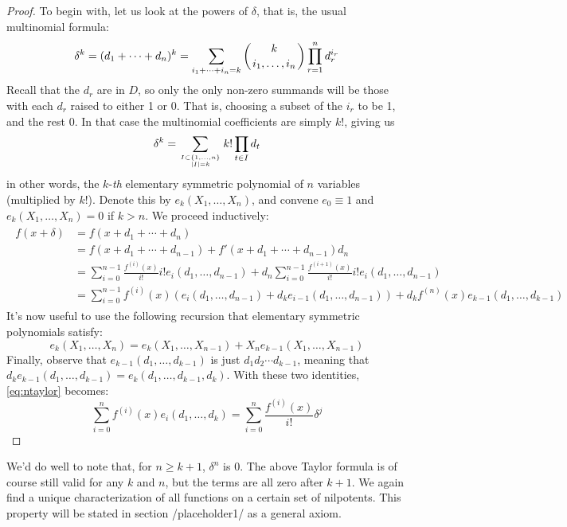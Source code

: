 \documentclass[11pt]{article}
\theoremstyle{definition}
\newcommand{\abs}[1]{\lvert #1 \rvert} %
\numberwithin{equation}{section}
\begin{document}
\begin{proof}
  To begin with, let us look at the powers of \( \delta \), that is, the usual multinomial formula:
  \[
    \delta^k = (d_1+\cdots+d_n)^k = \sum_{i_1+\cdots+i_n=k}\left( k\atop i_1,\dots,i_n \right)\prod_{r=1}^{n}d_r^{i_r}
  \]
  Recall that the \( d_r \) are in \( D \), so only the only non-zero summands will be those with each \( d_r \) raised to either 1 or 0. That is, choosing a subset of the \( i_r \) to be 1, and the rest 0. In that case the multinomial coefficients are simply \( k! \), giving us
  \[
    \delta^k = \sum_{I\subset \{1,\dots,n\}\atop \abs{I}=k}k!\prod_{t\in I}d_t
  \]
  in other words, the \( k \)-\textit{th} elementary symmetric polynomial of \( n \) variables (multiplied by \( k! \)). Denote this by \( e_k(X_1,\dots,X_n) \), and convene \( e_0 \equiv 1 \) and \( e_k(X_1,\dots,X_n) = 0 \) if \( k>n \). We proceed inductively:
  \begin{align}
    \begin{split}
      f(x+\delta) & = f(x+d_1+\cdots+d_n) \\[10pt]
                  & = f(x+d_1+\cdots+d_{n-1})+f'(x+d_1+\cdots+d_{n-1})d_n \\[10pt]
		  & = \sum_{i=0}^{n-1}\frac{f^{(i)}(x)}{i!}i!e_i(d_1,\dots,d_{n-1}) + d_n\sum_{i=0}^{n-1}\frac{f^{(i+1)}(x)}{i!}i!e_i(d_1,\dots,d_{n-1}) \\[10pt]
                  & = \sum_{i=0}^{n-1}f^{(i)}(x)\left( e_i(d_1,\dots,d_{n-1})+d_ke_{i-1}(d_1,\dots,d_{n-1})\right) + d_kf^{(n)}(x)e_{k-1}(d_1,\dots,d_{k-1})
    \end{split}
    \label{eq:ntaylor}
  \end{align}
It's now useful to use the following recursion that elementary symmetric polynomials satisfy:
\[
  e_k(X_1,\dots,X_n) = e_{k}(X_1,\dots,X_{n-1}) + X_{n}e_{k-1}(X_1,\dots,X_{n-1})
\]
Finally, observe that \( e_{k-1}(d_1,\dots,d_{k-1}) \) is just \( d_1d_2\cdots d_{k-1} \), meaning that \( d_ke_{k-1}(d_1,\dots,d_{k-1}) = e_k(d_1,\dots, d_{k-1},d_k) \). With these two identities, \ref{eq:ntaylor} becomes:
\[
  \sum_{i=0}^{n}f^{(i)}(x)e_i(d_1,\dots,d_k)= \sum_{i=0}^n \frac{f^{(i)}(x)}{i!}\delta^j
\]
\end{proof}

We'd do well to note that, for \( n\geq k+1 \), \( \delta^n \) is 0. The above Taylor formula is of course still valid for any \( k \) and \( n \), but the terms are all zero after \( k+1 \). We again find a unique characterization of all functions on a certain set of nilpotents. This property will be stated in section {/placeholder1/} as a general axiom.
\end{document}
